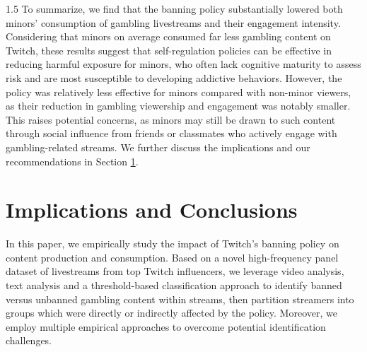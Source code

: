 \documentclass[a4paper,12pt]{article}
\begin{document}
\begin{spacing}{1.5}
To summarize, we find that the banning policy substantially lowered both minors’ consumption of gambling livestreams and their engagement intensity. Considering that minors on average consumed far less gambling content on Twitch, these results suggest that self-regulation policies can be effective in reducing harmful exposure for minors, who often lack cognitive maturity to assess risk and are most susceptible to developing addictive behaviors. However, the policy was relatively less effective for minors compared with non-minor viewers, as their reduction in gambling viewership and engagement was notably smaller. This raises potential concerns, as minors may still be drawn to such content through social influence from friends or classmates who actively engage with gambling-related streams. We further discuss the implications and our recommendations in Section \ref{section-conclusion}. 



\section{Implications and Conclusions}\label{section-conclusion}

In this paper, we empirically study the impact of Twitch's banning policy on content production and consumption. Based on a novel high-frequency panel dataset of livestreams from top Twitch influencers, we leverage video analysis, text analysis and a threshold-based classification approach to identify banned versus unbanned gambling content within streams, then partition streamers into groups which were directly or indirectly affected by the policy. Moreover, we employ multiple empirical approaches to overcome potential identification challenges.


\end{spacing}
\end{document}
